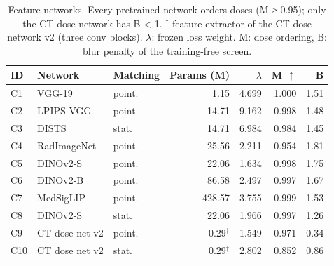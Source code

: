 \begin{table}[t]
\centering
\small
\setlength{\tabcolsep}{3pt}
\caption{Feature networks. Every pretrained network orders doses (M ≥ 0.95); only the CT dose network has B < 1. $^{\dagger}$ feature extractor of the CT dose network v2 (three conv blocks). $\lambda$: frozen loss weight. M: dose ordering, B: blur penalty of the training-free screen.}
\label{tab:networks}
\begin{tabular}{lllrrrr}
\toprule
ID & Network & Matching & Params (M) & $\lambda$ & M $\uparrow$ & B \\
\midrule
C1 & VGG-19 & point. & 1.15 & 4.699 & 1.000 & 1.51 \\
C2 & LPIPS-VGG & point. & 14.71 & 9.162 & 0.998 & 1.48 \\
C3 & DISTS & stat. & 14.71 & 6.984 & 0.984 & 1.45 \\
C4 & RadImageNet & point. & 25.56 & 2.211 & 0.954 & 1.81 \\
C5 & DINOv2-S & point. & 22.06 & 1.634 & 0.998 & 1.75 \\
C6 & DINOv2-B & point. & 86.58 & 2.497 & 0.997 & 1.67 \\
C7 & MedSigLIP & point. & 428.57 & 3.755 & 0.999 & 1.53 \\
C8 & DINOv2-S & stat. & 22.06 & 1.966 & 0.997 & 1.26 \\
C9 & CT dose net v2 & point. & 0.29$^{\dagger}$ & 1.549 & 0.971 & 0.34 \\
C10 & CT dose net v2 & stat. & 0.29$^{\dagger}$ & 2.802 & 0.852 & 0.86 \\
\bottomrule
\end{tabular}
\end{table}
